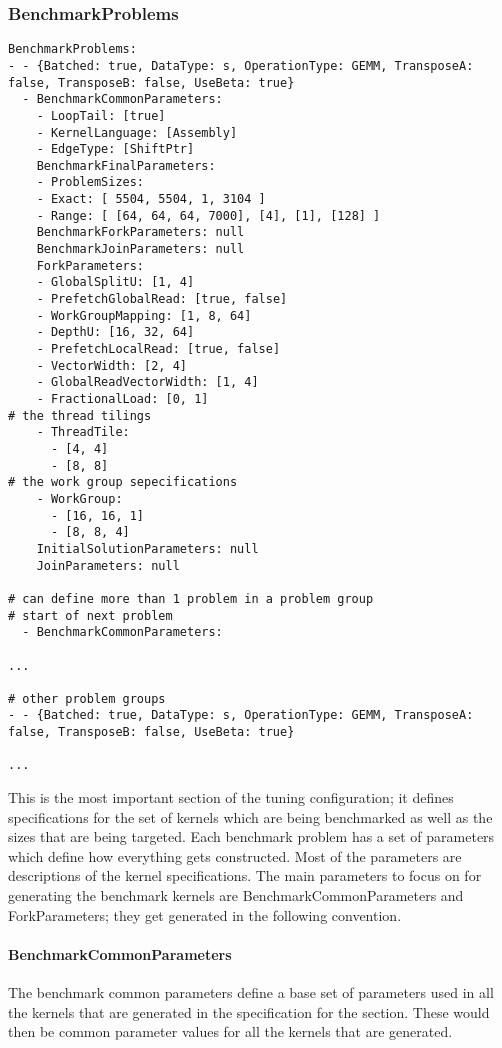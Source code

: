 \documentclass[]{article}
\begin{document}
\subsubsection{BenchmarkProblems}
\begin{verbatim}
BenchmarkProblems:
- - {Batched: true, DataType: s, OperationType: GEMM, TransposeA: false, TransposeB: false, UseBeta: true}
  - BenchmarkCommonParameters:
    - LoopTail: [true]
    - KernelLanguage: [Assembly]
    - EdgeType: [ShiftPtr]
    BenchmarkFinalParameters: 
    - ProblemSizes:
    - Exact: [ 5504, 5504, 1, 3104 ]
    - Range: [ [64, 64, 64, 7000], [4], [1], [128] ]
    BenchmarkForkParameters: null
    BenchmarkJoinParameters: null
    ForkParameters:
    - GlobalSplitU: [1, 4]
    - PrefetchGlobalRead: [true, false]
    - WorkGroupMapping: [1, 8, 64]
    - DepthU: [16, 32, 64]
    - PrefetchLocalRead: [true, false]
    - VectorWidth: [2, 4]
    - GlobalReadVectorWidth: [1, 4]
    - FractionalLoad: [0, 1]
# the thread tilings
    - ThreadTile:
      - [4, 4]
      - [8, 8]
# the work group sepecifications
    - WorkGroup:
      - [16, 16, 1]
      - [8, 8, 4]
    InitialSolutionParameters: null
    JoinParameters: null

# can define more than 1 problem in a problem group
# start of next problem
  - BenchmarkCommonParameters:    
  
...

# other problem groups
- - {Batched: true, DataType: s, OperationType: GEMM, TransposeA: false, TransposeB: false, UseBeta: true}

...

\end{verbatim}

This is the most important section of the tuning configuration; it defines specifications for the set of kernels which are being benchmarked as well as the sizes that are being targeted. Each benchmark problem has a set of parameters which define how everything gets constructed. Most of the parameters are descriptions of the kernel specifications. The main parameters to focus on for generating the benchmark kernels are BenchmarkCommonParameters and ForkParameters; they get generated in the following convention.

\paragraph{BenchmarkCommonParameters} The benchmark common parameters define a base set of parameters used in all the kernels that are generated in the specification for the section. These would then be common parameter values for all the kernels that are generated.
\end{document}
